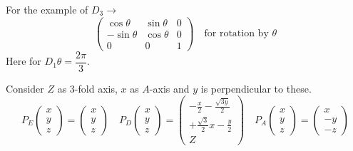 For the example of $D_{3} \to$
$$
\left(
\begin{matrix}
\cos\theta & \sin\theta & 0\\
-\sin\theta & \cos\theta & 0\\
0 & 0 & 1
\end{matrix}
\right)\quad\text{for rotation by $\theta$}
$$
Here for $D_{1}\theta=\dfrac{2\pi}{3}$.

Consider $Z$ as 3-fold axis, $x$ as $A$-axis and $y$ is perpendicular to these.
$$
P_{E}
\left(\begin{matrix}
x\\
y\\
z
\end{matrix}\right)
=
\left(\begin{matrix}
x\\
y\\
z
\end{matrix}\right)
\quad
P_{D}
\left(\begin{matrix}
x\\
y\\
z
\end{matrix}\right)=
\left(
\begin{array}{c}
-\frac{x}{2} -\frac{\sqrt{3y}}{2}\\[3pt]
+\frac{\sqrt{3}}{2}x -\frac{y}{2}\\[3pt]
Z
\end{array}
\right)
\quad 
P_{A}
\left(\begin{matrix}
x\\
y\\
z
\end{matrix}\right)
=
\left(\begin{matrix}
x\\
-y\\
-z
\end{matrix}\right)
$$

